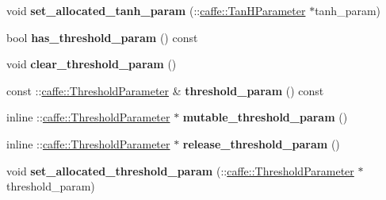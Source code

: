 \begin{DoxyCompactItemize}
\item 
\mbox{\label{classcaffe_1_1_v1_layer_parameter_a94a46fe14dc33248ffcab02cfb3df6ed}} 
void {\bfseries set\+\_\+allocated\+\_\+tanh\+\_\+param} (\+::\mbox{\hyperlink{classcaffe_1_1_tan_h_parameter}{caffe\+::\+Tan\+H\+Parameter}} $\ast$tanh\+\_\+param)
\item 
\mbox{\label{classcaffe_1_1_v1_layer_parameter_ab2514e8a4b3a735e7c3e076681692eb4}} 
bool {\bfseries has\+\_\+threshold\+\_\+param} () const
\item 
\mbox{\label{classcaffe_1_1_v1_layer_parameter_a8b65c2f335f8eaa22d2804ae51f3e776}} 
void {\bfseries clear\+\_\+threshold\+\_\+param} ()
\item 
\mbox{\label{classcaffe_1_1_v1_layer_parameter_a72d34a203b5c17c080f98ecaae98bc25}} 
const \+::\mbox{\hyperlink{classcaffe_1_1_threshold_parameter}{caffe\+::\+Threshold\+Parameter}} \& {\bfseries threshold\+\_\+param} () const
\item 
\mbox{\label{classcaffe_1_1_v1_layer_parameter_a4dec01ce650b800c3dfd4107a29e5e1e}} 
inline \+::\mbox{\hyperlink{classcaffe_1_1_threshold_parameter}{caffe\+::\+Threshold\+Parameter}} $\ast$ {\bfseries mutable\+\_\+threshold\+\_\+param} ()
\item 
\mbox{\label{classcaffe_1_1_v1_layer_parameter_acaaf9b63d95c5be036e84a84c199122c}} 
inline \+::\mbox{\hyperlink{classcaffe_1_1_threshold_parameter}{caffe\+::\+Threshold\+Parameter}} $\ast$ {\bfseries release\+\_\+threshold\+\_\+param} ()
\item 
\mbox{\label{classcaffe_1_1_v1_layer_parameter_a15ccf36cfee9eaf1b8546d9e78074434}} 
void {\bfseries set\+\_\+allocated\+\_\+threshold\+\_\+param} (\+::\mbox{\hyperlink{classcaffe_1_1_threshold_parameter}{caffe\+::\+Threshold\+Parameter}} $\ast$threshold\+\_\+param)
\item 
\mbox{\label{classcaffe_1_1_v1_layer_parameter_a1f1b3c6c96761d3bdefb3fdde4ad9948}} 

\end{DoxyCompactItemize}
